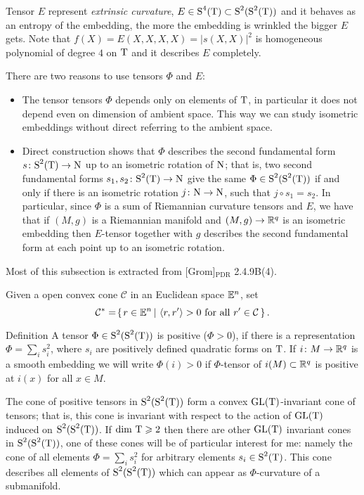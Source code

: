 \documentclass{article}
\begin{document}
Tensor
$E$ represent \emph{ extrinsic curvature},
$E\in \text{\rm S}^4(\text{\rm T})\subset \text{\rm S}^2(\text{\rm S}^2(\text{\rm T}))$ and it
behaves as an entropy of the embedding,
the more the embedding is wrinkled the bigger $E$ gets.
Note that
$f(X)=E(X,X,X,X)=|s(X,X)|^2$
is homogeneous polynomial of degree $4$ on $\text{\rm T}$ 
and it describes $E$ completely.

There are two reasons to use tensors $\Phi$ and $E$: 
\begin{itemize}
\item The tensor tensors $\Phi$ depends only on elements of $\text{\rm T}$, 
in particular it does not depend even on dimension of ambient space.
This way we can study isometric embeddings without direct referring to the ambient space.
\item Direct
construction shows that $\Phi$ describes the second fundamental
form $s\colon\text{\rm S}^2(\text{\rm T})\to \text{\rm N}$
up to an isometric rotation of $\text{\rm N}$;
that is, two second
fundamental forms $s_1,s_2\colon\text{\rm S}^2(\text{\rm T})\to \text{\rm N}$ 
give the same $\Phi\in\text{\rm S}^2(\text{\rm S}^2(\text{\rm T}))$ if and only if there is an isometric rotation
$j\colon\text{\rm N}\to \text{\rm N}$, such that $j\circ s_1=s_2$. 
In particular, since
$\Phi$ is a sum of Riemannian curvature tensors and $E$, we have
that if $(M,g)$ is a Riemannian manifold and $(M,g)\to \mathbb{R}^q$ is
an isometric embedding then $E$-tensor together with $g$ describes
the second fundamental form at each point up to an isometric
rotation.
\end{itemize}




Most of this subsection is extracted from [Grom]$_{\text{PDR}}$ 2.4.9B(4).

Given a open convex cone $\mathcal{C}$
in an Euclidean space $\mathbb{E}^n$, set
$$\mathcal{C}^*=\set{r\in \EE^n}{\langle r,r'\rangle >0 \text{ for all }r'\in \mathcal{C}}.$$

\begin{thm}{Definition} A tensor $\Phi\in \text{\rm S}^2(\text{\rm S}^2(\text{\rm T}))$
is positive ($\Phi> 0$), if there is a
representation $\Phi=\sum_i s_i^2$, where $s_i$ are positively defined
quadratic forms on $\text{\rm T}$.
If $i\colon M\to \mathbb{R}^q$ is a smooth embedding we will write
$\Phi(i)>0$ if $\Phi$-tensor of $i(M)\subset \mathbb{R}^q$ is positive
at $i(x)$ for all $x\in M$.
\end{thm}


The cone of positive tensors in $\text{\rm S}^2(\text{\rm S}^2(\text{\rm T}))$ form a convex
$\mathrm{GL}(\text{\rm T})$-invariant cone of tensors;
that is, this cone is invariant with respect to the action of $\mathrm{GL}(\text{\rm T})$ induced on $\text{\rm S}^2(\text{\rm S}^2(\text{\rm T}))$.
If $\text{dim }\text{\rm T}\geqslant 2$ then
there are other $\mathrm{GL}(\text{\rm T})$ invariant cones in $\text{\rm S}^2(\text{\rm S}^2(\text{\rm T}))$, one of
these cones will be of particular interest for me: namely the cone
of all elements $\Phi=\sum_i s_i^2$ for arbitrary elements $s_i\in
\text{\rm S}^2(\text{\rm T})$. This cone describes all elements of $\text{\rm S}^2(\text{\rm S}^2(\text{\rm T}))$ which
can appear as $\Phi$-curvature of a submanifold.
\end{document}
